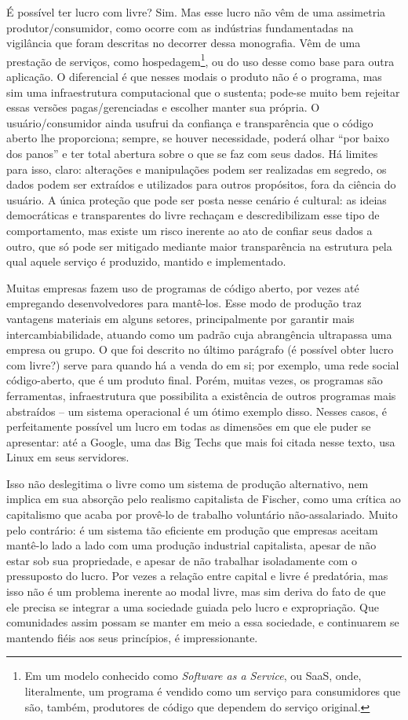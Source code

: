 É possível ter lucro com \swr{} livre?
Sim.
Mas esse lucro não vêm de uma assimetria produtor/consumidor, como ocorre com as indústrias fundamentadas na vigilância que foram descritas no decorrer dessa monografia.
Vêm de uma prestação de serviços, como hospedagem\footnote{Em um modelo conhecido como \textit{Software as a Service}, ou SaaS, onde, literalmente, um programa é vendido como um serviço para consumidores que são, também, produtores de código que dependem do serviço original.}, ou do uso desse \swr{} como base para outra aplicação.
O diferencial é que nesses modais o produto não é o programa, mas sim uma infraestrutura computacional que o sustenta; pode-se muito bem rejeitar essas versões pagas/gerenciadas e escolher manter sua própria.
O usuário/consumidor ainda usufrui da confiança e transparência que o código aberto lhe proporciona; sempre, se houver necessidade, poderá olhar ``por baixo dos panos'' e ter total abertura sobre o que se faz com seus dados.
Há limites para isso, claro: alterações e manipulações podem ser realizadas em segredo, os dados podem ser extraídos e utilizados para outros propósitos, fora da ciência do usuário.
A única proteção que pode ser posta nesse cenário é cultural: as ideias democráticas e transparentes do \swr{} livre rechaçam e descredibilizam esse tipo de comportamento, mas existe um risco inerente ao ato de confiar seus dados a outro, que só pode ser mitigado mediante maior transparência na estrutura pela qual aquele serviço é produzido, mantido e implementado.

Muitas empresas fazem uso de programas de código aberto, por vezes até empregando desenvolvedores para mantê-los.
Esse modo de produção traz vantagens materiais em alguns setores, principalmente por garantir mais intercambiabilidade, atuando como um padrão cuja abrangência ultrapassa uma empresa ou grupo.
O que foi descrito no último parágrafo (é possível obter lucro com \swr{} livre?) serve para quando há a venda do \swr{} em si; por exemplo, uma rede social código-aberto, que é um produto final.
Porém, muitas vezes, os programas são ferramentas, infraestrutura que possibilita a existência de outros programas mais abstraídos -- um sistema operacional é um ótimo exemplo disso.
Nesses casos, é perfeitamente possível um lucro em todas as dimensões em que ele puder se apresentar: até a Google, uma das Big Techs que mais foi citada nesse texto, usa Linux em seus servidores.

Isso não deslegitima o \swr{} livre como um sistema de produção alternativo, nem implica em sua absorção pelo realismo capitalista de Fischer, como uma crítica ao capitalismo que acaba por provê-lo de trabalho voluntário não-assalariado.
Muito pelo contrário: é um sistema tão eficiente em produção que empresas aceitam mantê-lo lado a lado com uma produção industrial capitalista, apesar de não estar sob sua propriedade, e apesar de não trabalhar isoladamente com o pressuposto do lucro.
Por vezes a relação entre capital e \swr{} livre é predatória, mas isso não é um problema inerente ao modal livre, mas sim deriva do fato de que ele precisa se integrar a uma sociedade guiada pelo lucro e expropriação.
Que comunidades assim possam se manter em meio a essa sociedade, e continuarem se mantendo fiéis aos seus princípios, é impressionante.


